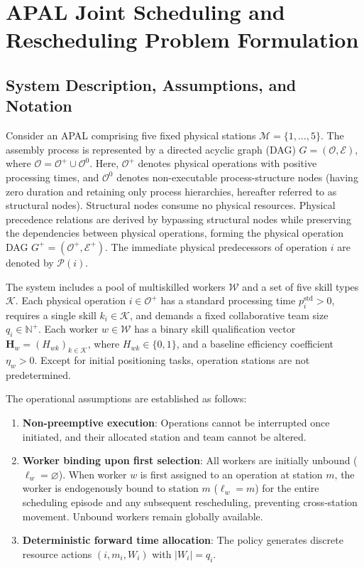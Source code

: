 \documentclass[journal,10pt]{IEEEtran}
\begin{document}
\section{APAL Joint Scheduling and Rescheduling Problem Formulation}\label{sec:formulation}

\subsection{System Description, Assumptions, and Notation}

Consider an APAL comprising five fixed physical stations $\mathcal{M}=\{1,\dots,5\}$. The assembly process is represented by a directed acyclic graph (DAG) $G=(\mathcal{O},\mathcal{E})$, where $\mathcal{O}=\mathcal{O}^+\cup\mathcal{O}^0$. Here, $\mathcal{O}^+$ denotes physical operations with positive processing times, and $\mathcal{O}^0$ denotes non-executable process-structure nodes (having zero duration and retaining only process hierarchies, hereafter referred to as structural nodes). Structural nodes consume no physical resources. Physical precedence relations are derived by bypassing structural nodes while preserving the dependencies between physical operations, forming the physical operation DAG $G^+=(\mathcal{O}^+,\mathcal{E}^+)$. The immediate physical predecessors of operation $i$ are denoted by $\mathcal{P}(i)$.

The system includes a pool of multiskilled workers $\mathcal{W}$ and a set of five skill types $\mathcal{K}$. Each physical operation $i\in\mathcal{O}^+$ has a standard processing time $p_i^{\mathrm{std}}>0$, requires a single skill $k_i\in\mathcal{K}$, and demands a fixed collaborative team size $q_i\in\mathbb{N}^+$. Each worker $w\in\mathcal{W}$ has a binary skill qualification vector $\mathbf{H}_w=(H_{wk})_{k\in\mathcal{K}}$, where $H_{wk}\in\{0,1\}$, and a baseline efficiency coefficient $\eta_w>0$. Except for initial positioning tasks, operation stations are not predetermined.

The operational assumptions are established as follows:
\begin{enumerate}
\item \textbf{Non-preemptive execution}: Operations cannot be interrupted once initiated, and their allocated station and team cannot be altered.
\item \textbf{Worker binding upon first selection}: All workers are initially unbound ($\ell_w=\varnothing$). When worker $w$ is first assigned to an operation at station $m$, the worker is endogenously bound to station $m$ ($\ell_w=m$) for the entire scheduling episode and any subsequent rescheduling, preventing cross-station movement. Unbound workers remain globally available.
\item \textbf{Deterministic forward time allocation}: The policy generates discrete resource actions $(i, m_i, W_i)$ with $|W_i|=q_i$.
\end{enumerate}
\end{document}
